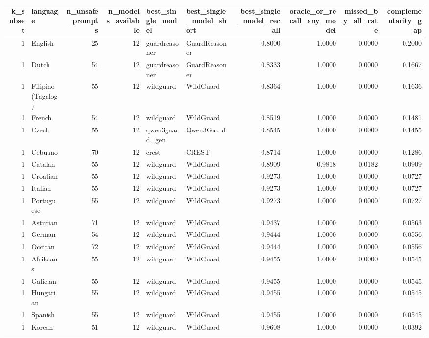 \begin{tabular}{rlrrllrrrr}
\toprule
k\_subset & language & n\_unsafe\_prompts & n\_models\_available & best\_single\_model & best\_single\_model\_short & best\_single\_model\_recall & oracle\_or\_recall\_any\_model & missed\_by\_all\_rate & complementarity\_gap \\
\midrule
1 & English & 25 & 12 & guardreasoner & GuardReasoner & 0.8000 & 1.0000 & 0.0000 & 0.2000 \\
1 & Dutch & 54 & 12 & guardreasoner & GuardReasoner & 0.8333 & 1.0000 & 0.0000 & 0.1667 \\
1 & Filipino (Tagalog) & 55 & 12 & wildguard & WildGuard & 0.8364 & 1.0000 & 0.0000 & 0.1636 \\
1 & French & 54 & 12 & wildguard & WildGuard & 0.8519 & 1.0000 & 0.0000 & 0.1481 \\
1 & Czech & 55 & 12 & qwen3guard\_gen & Qwen3Guard & 0.8545 & 1.0000 & 0.0000 & 0.1455 \\
1 & Cebuano & 70 & 12 & crest & CREST & 0.8714 & 1.0000 & 0.0000 & 0.1286 \\
1 & Catalan & 55 & 12 & wildguard & WildGuard & 0.8909 & 0.9818 & 0.0182 & 0.0909 \\
1 & Croatian & 55 & 12 & wildguard & WildGuard & 0.9273 & 1.0000 & 0.0000 & 0.0727 \\
1 & Italian & 55 & 12 & wildguard & WildGuard & 0.9273 & 1.0000 & 0.0000 & 0.0727 \\
1 & Portuguese & 55 & 12 & wildguard & WildGuard & 0.9273 & 1.0000 & 0.0000 & 0.0727 \\
1 & Asturian & 71 & 12 & wildguard & WildGuard & 0.9437 & 1.0000 & 0.0000 & 0.0563 \\
1 & German & 54 & 12 & wildguard & WildGuard & 0.9444 & 1.0000 & 0.0000 & 0.0556 \\
1 & Occitan & 72 & 12 & wildguard & WildGuard & 0.9444 & 1.0000 & 0.0000 & 0.0556 \\
1 & Afrikaans & 55 & 12 & wildguard & WildGuard & 0.9455 & 1.0000 & 0.0000 & 0.0545 \\
1 & Galician & 55 & 12 & wildguard & WildGuard & 0.9455 & 1.0000 & 0.0000 & 0.0545 \\
1 & Hungarian & 55 & 12 & wildguard & WildGuard & 0.9455 & 1.0000 & 0.0000 & 0.0545 \\
1 & Spanish & 55 & 12 & wildguard & WildGuard & 0.9455 & 1.0000 & 0.0000 & 0.0545 \\
1 & Korean & 51 & 12 & wildguard & WildGuard & 0.9608 & 1.0000 & 0.0000 & 0.0392 \\

\end{tabular}
